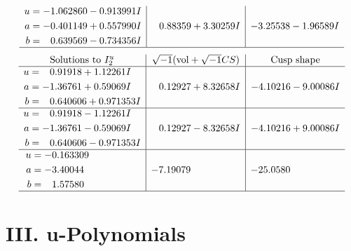 \documentclass[1p]{elsarticle_modified}
\theoremstyle{definition}
\newcommand{\I}{\sqrt{-1}}
\begin{document}
$$\begin{array}{c|c|c}
\begin{aligned}
u &= -1.062860 - 0.913991 I \\
a &= -0.401149 + 0.557990 I \\
b &= \phantom{-}0.639569 - 0.734356 I\end{aligned}
 & \phantom{-}0.88359 + 3.30259 I & -3.25538 - 1.96589 I\\
 \hline 
 \end{array}$$\newpage$$\begin{array}{c|c|c}  
\text{Solutions to }I^u_{2}& \I (\text{vol} + \sqrt{-1}CS) & \text{Cusp shape}\\
 \hline 
\begin{aligned}
u &= \phantom{-}0.91918 + 1.12261 I \\
a &= -1.36761 + 0.59069 I \\
b &= \phantom{-}0.640606 + 0.971353 I\end{aligned}
 & \phantom{-}0.12927 + 8.32658 I & -4.10216 - 9.00086 I \\ \hline\begin{aligned}
u &= \phantom{-}0.91918 - 1.12261 I \\
a &= -1.36761 - 0.59069 I \\
b &= \phantom{-}0.640606 - 0.971353 I\end{aligned}
 & \phantom{-}0.12927 - 8.32658 I & -4.10216 + 9.00086 I \\ \hline\begin{aligned}
u &= -0.163309\phantom{ +0.000000I} \\
a &= -3.40044\phantom{ +0.000000I} \\
b &= \phantom{-}1.57580\phantom{ +0.000000I}\end{aligned}
 & -7.19079\phantom{ +0.000000I} & -25.0580\phantom{ +0.000000I}\\
 \hline 
 \end{array}$$\newpage
\newpage\renewcommand{\arraystretch}{1}
\centering \section*{ III. u-Polynomials}
\end{document}
